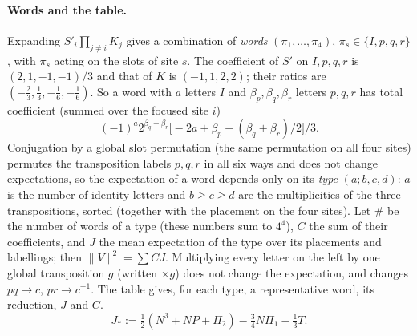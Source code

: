 \paragraph{Words and the table.} Expanding \(S'_i\prod_{j\ne i}K_j\) gives a combination of
\emph{words} \((\pi_1,\dots,\pi_4)\), \(\pi_s\in\{I,p,q,r\}\), with \(\pi_s\) acting on the slots of site \(s\).
The coefficient of \(S'\) on \(I,p,q,r\) is \((2,1,-1,-1)/3\) and that of \(K\) is \((-1,1,2,2)\); their
ratios are \((-\tfrac23,\tfrac13,-\tfrac16,-\tfrac16)\). So a word with \(a\) letters \(I\) and
\(\beta_p,\beta_q,\beta_r\) letters \(p,q,r\) has total coefficient (summed over the focused site \(i\)) \[
(-1)^a2^{\beta_q+\beta_r}\bigl[-2a+\beta_p-(\beta_q+\beta_r)/2\bigr]/3 .
\] Conjugation by a global slot permutation (the same permutation on all four sites) permutes the
transposition labels \(p,q,r\) in all six ways and does not change expectations, so the expectation of a word depends only on its \emph{type}
\((a;b,c,d)\): \(a\) is the number of identity letters and \(b\ge c\ge d\) are the multiplicities of the three
transpositions, sorted (together with the placement on the four sites). Let \(\#\) be the number of words of a type (these numbers sum to
\(4^4\)), \(C\) the sum of their coefficients, and \(J\) the mean expectation of the type over its placements
and labellings; then \(\|V\|^2=\sum CJ\). Multiplying every letter on the left by one global transposition \(g\) (written
\(\times g\)) does not change the expectation, and changes \(pq\to c\), \(pr\to c^{-1}\).
The table gives, for each type, a representative word, its reduction, \(J\) and \(C\).
\[
J_*:=\tfrac12(N^3+NP+\Pi_2)-\tfrac34N\Pi_1-\tfrac13T .
\]

